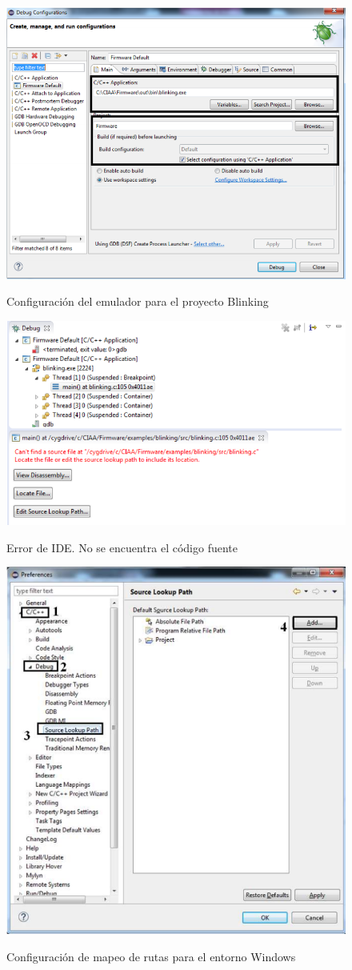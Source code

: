 \documentclass[12pt,letterpaper]{article}
\begin{document}
\begin{center}
\begin{figure}[!h]
\centering
\includegraphics[width=8 cm]{figuras/primer_proy13.png}\\
\caption{Configuración del emulador para el proyecto Blinking}
\label{primer_proy13}
\end{figure}
\end{center}

\begin{center}
\begin{figure}[!h]
\centering
\includegraphics[width=10 cm]{figuras/primer_proy14.png}\\
\caption{Error de IDE. No se encuentra el código fuente}
\label{primer_proy14}
\end{figure}
\end{center}

\begin{center}
\begin{figure}[!h]
\centering
\includegraphics[width=5 cm]{figuras/primer_proy15.png}\\
\caption{Configuración de mapeo de rutas para el entorno Windows}
\label{primer_proy15}
\end{figure}
\end{center}
\end{document}
